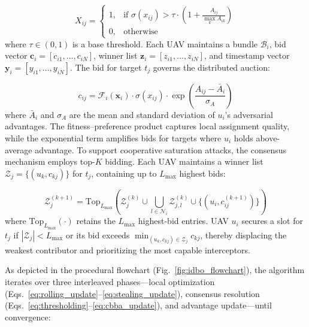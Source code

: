 \documentclass[lettersize,journal]{IEEEtran}
\begin{document}
\begin{equation}
\label{eq:thresholding}
X_{ij} = 
\begin{cases}
1, & \text{if } \sigma(x_{ij}) > \tau \cdot \left(1 + \frac{A_{ij}}{\max_k A_{ik}}\right) \\
0, & \text{otherwise}
\end{cases}
\end{equation}
where $\tau \in (0,1)$ is a base threshold. Each UAV maintains a bundle $\mathcal{B}_i$, bid vector $\mathbf{c}_i = [c_{i1}, \dots, c_{iN}]$, winner list $\mathbf{z}_i = [z_{i1}, \dots, z_{iN}]$, and timestamp vector $\mathbf{y}_i = [y_{i1}, \dots, y_{iN}]$. The bid for target $t_j$ governs the distributed auction:

\begin{equation}
\label{eq:bid_formulation}
c_{ij} = \mathcal{F}_i(\mathbf{x}_i) \cdot \sigma(x_{ij}) \cdot \exp\left(\frac{A_{ij} - \bar{A}_i}{\sigma_A}\right)
\end{equation}
where $\bar{A}_i$ and $\sigma_A$ are the mean and standard deviation of $u_i$'s adversarial advantages. The fitness--preference product captures local assignment quality, while the exponential term amplifies bids for targets where $u_i$ holds above-average advantage. To support cooperative saturation attacks, the consensus mechanism employs top-$K$ bidding. Each UAV maintains a winner list $\mathcal{Z}_{j} = \{(u_k, c_{kj})\}$ for $t_j$, containing up to $L_{\max}$ highest bids:

\begin{equation}
\label{eq:cbba_update}
\mathcal{Z}_{j}^{(k+1)} = \text{Top}_{L_{\max}} \left( \mathcal{Z}_{j}^{(k)} \cup \bigcup_{l \in \mathcal{N}_i} \mathcal{Z}_{j,l}^{(k)} \cup \{(u_i, c_{ij}^{(k+1)})\} \right)
\end{equation}
where $\text{Top}_{L_{\max}}(\cdot)$ retains the $L_{\max}$ highest-bid entries. UAV $u_i$ secures a slot for $t_j$ if $|\mathcal{Z}_{j}| < L_{\max}$ or its bid exceeds $\min_{(u_k, c_{kj}) \in \mathcal{Z}_{j}} c_{kj}$, thereby displacing the weakest contributor and prioritizing the most capable interceptors.

As depicted in the procedural flowchart (Fig.~\ref{fig:idbo_flowchart}), the algorithm iterates over three interleaved phases—local optimization (Eqs.~\ref{eq:rolling_update}--\ref{eq:stealing_update}), consensus resolution (Eqs.~\ref{eq:thresholding}--\ref{eq:cbba_update}), and advantage update—until convergence:
\end{document}
